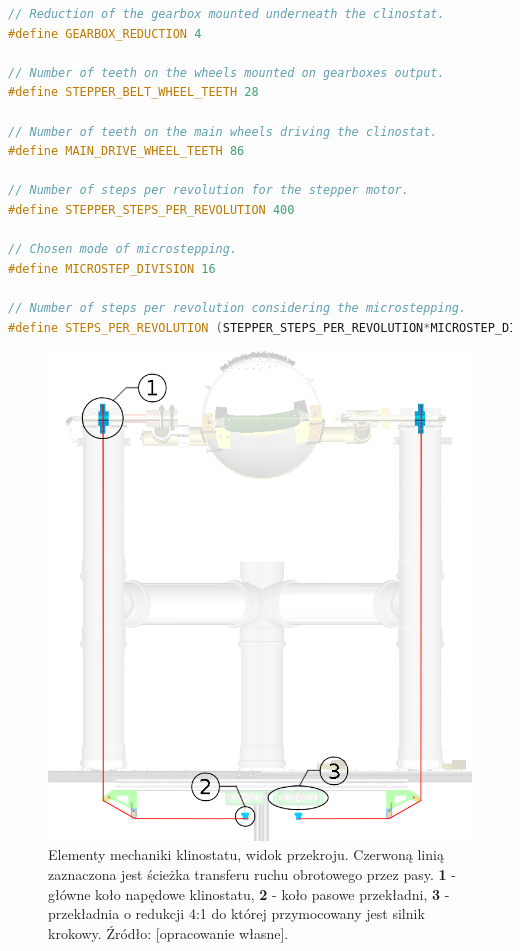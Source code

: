 \begin{lstlisting}[language=C++, caption=Plik \textbf{clinostat\_mechanics.hpp}.]
// Reduction of the gearbox mounted underneath the clinostat.
#define GEARBOX_REDUCTION 4 

// Number of teeth on the wheels mounted on gearboxes output.
#define STEPPER_BELT_WHEEL_TEETH 28 

// Number of teeth on the main wheels driving the clinostat.
#define MAIN_DRIVE_WHEEL_TEETH 86 

// Number of steps per revolution for the stepper motor.
#define STEPPER_STEPS_PER_REVOLUTION 400 

// Chosen mode of microstepping.
#define MICROSTEP_DIVISION 16 

// Number of steps per revolution considering the microstepping.
#define STEPS_PER_REVOLUTION (STEPPER_STEPS_PER_REVOLUTION*MICROSTEP_DIVISION)
\end{lstlisting}

\begin{figure}[h]
	
	\centering
	\includegraphics[scale=0.3]{klinostat_przekroj}
	\caption{Elementy mechaniki klinostatu, widok przekroju. Czerwoną linią zaznaczona jest ścieżka transferu ruchu obrotowego przez pasy. \textbf{1} - główne koło napędowe klinostatu, \textbf{2} - koło pasowe przekładni, \textbf{3} - przekładnia o redukcji 4:1 do której przymocowany jest silnik krokowy. Źródło: [opracowanie własne].} 
	\label{fig:klinostat_mechanika}
\end{figure}

